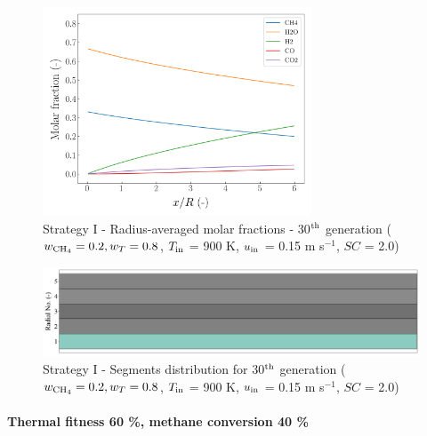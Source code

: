 \documentclass[preprint,12pt]{elsarticle}
\begin{document}
\begin{figure}[h!]
\centering
\includegraphics[width=80mm]{results/5/20C_80T/GEN30-AVG.png}
\caption{\label{fig:5R2080G30-avg} Strategy I - Radius-averaged molar fractions -  30$^{\rm{th}}$ generation ($w_{\rm{CH_4}} = 0.2, w_T = 0.8$, $T_{\rm{in}}$ = 900 K, $u_{\rm{in}}$ = 0.15 m s$^{-1}$, $SC$ = 2.0)}
\end{figure}

\begin{figure}[h!]
\centering
\includegraphics[width=120mm]{results/segments/5seg/20C80T/seg.png}
\caption{\label{fig:30L6040G1-TField} Strategy I - Segments distribution for 30$^{\rm{th}}$ generation ($w_{\rm{CH_4}} = 0.2, w_T = 0.8$, $T_{\rm{in}}$ = 900 K, $u_{\rm{in}}$ = 0.15 m s$^{-1}$, $SC$ = 2.0)}
\end{figure}




\clearpage



\paragraph{Thermal fitness 60 \%, methane conversion 40 \%} \hspace{0pt} \\
\noindent 
\end{document}
